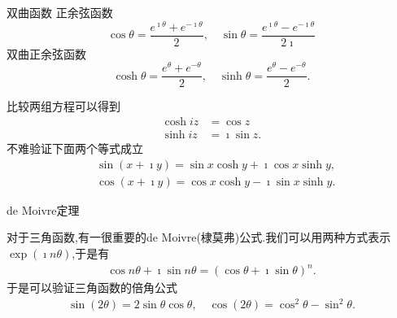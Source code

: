 \documentclass[fontset=windows, chinese, 10pt]{beamer}
\begin{document}
\begin{frame}{双曲函数}
正余弦函数
$$
\cos \theta = \frac{e^{\imath \theta} + e^{ -\imath \theta} }{2}, \quad     \sin \theta = \frac{e^{\imath \theta} - e^{ -\imath \theta} }{2\imath}
$$
双曲正余弦函数
$$
\cosh \theta = \frac{e^{\theta} + e^{ - \theta} }{2}, \quad     \sinh \theta = \frac{e^{\theta} - e^{ - \theta} }{2} .
$$

比较两组方程可以得到
\begin{align}
    \cosh iz &= \cos z
    \\
    \sinh iz &= \imath\sin z.
\end{align}
不难验证下面两个等式成立
\begin{equation}
    \begin{aligned}
    & \sin (x+\imath y)=\sin x \cosh y+\imath\cos x \sinh y, \\
    & \cos (x+\imath y)=\cos x \cosh y-\imath\sin x \sinh y.
    \end{aligned}
\end{equation}
\end{frame}

\begin{frame}{de Moivre定理}

对于三角函数,有一很重要的de Moivre(棣莫弗)公式.我们可以用两种方式表示$\exp(\imath n \theta)$,于是有
\begin{align}
    \cos n \theta + \imath \sin n\theta = (\cos \theta + \imath\sin \theta)^n  .
\end{align}
于是可以验证三角函数的倍角公式
\begin{align}
    \sin(2\theta) = 2\sin\theta \cos\theta, \quad \cos (2\theta) = \cos^2\theta - \sin^2\theta .
\end{align}



\end{frame}
\end{document}
